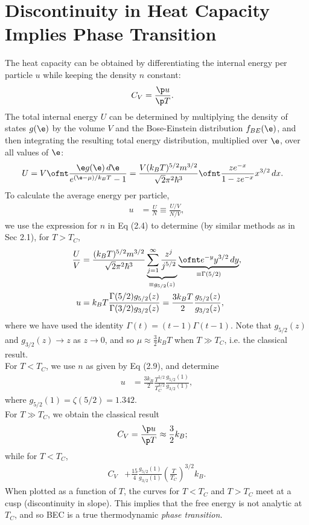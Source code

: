 \documentclass[qo.tex]{subfiles}
\begin{document}
\section{Discontinuity in Heat Capacity Implies Phase Transition}
The heat capacity can be obtained by differentiating the internal energy per particle $u$ while keeping the density $n$ constant:
\begin{align}
    C_V &= \frac{\p u}{\p T}.
\end{align}
The total internal energy $U$ can be determined by multiplying the density of states $g(\e)$ by the volume $V$ and the Bose-Einstein distribution $f_{BE}(\e)$, and then integrating the resulting total energy distribution, multiplied over $\e$, over all values of $\e$:
\begin{align}
    U &= V\ofnt \frac{\e g(\e)\,d\e}{e^{(\e-\mu)/k_BT}-1} = \frac{V(k_BT)^{5/2}m^{3/2}}{\sqrt{2}\pi^2\hbar^3}\ofnt \frac{ze^{-x}}{1-ze^{-x}}x^{3/2}\,dx.
\end{align}
To calculate the average energy per particle, 
\begin{align}
    u &= \frac{U}{N} \equiv \frac{U/V}{N/V},
\end{align}
we use the expression for $n$ in Eq (2.4) to determine (by similar methods as in Sec 2.1), for $T>T_C$,
\begin{align}
    \frac{U}{V} &= \frac{(k_BT)^{5/2}m^{3/2}}{\sqrt{2}\pi^2\hbar^3}\underbrace{\sum_{j=1}^\infty\frac{z^j}{j^{5/2}}}_{\equiv g_{5/2}(z)}\underbrace{\ofnt e^{-y}y^{3/2}\,dy}_{\equiv \Gamma(5/2)},\\
    u &= k_BT\frac{\Gamma(5/2)g_{5/2}(z)}{\Gamma(3/2)g_{3/2}(z)} = \frac{3k_BT}{2}\frac{g_{5/2}(z)}{g_{3/2}(z)},
\end{align}
where we have used the identity $\Gamma(t)=(t-1)\Gamma(t-1)$.
Note that $g_{5/2}(z)$ and $g_{3/2}(z) \to z$ as $z\to0$, and so $\mu\approx \frac32 k_BT$ when $T\gg T_C$, i.e. the classical result. \\
For $T<T_C$, we use $n$ as given by Eq (2.9), and determine
\begin{align}
    u &= \frac{3k_B}{2}\frac{T^{5/2}}{T^{3/2}_C}\frac{g_{5/2}(1)}{g_{3/2}(1)},
\end{align}
where $g_{5/2}(1)=\zeta(5/2)=1.342$.\\
For $T\gg T_C$, we obtain the classical result
\begin{align}
    C_V &= \frac{\p u}{\p T} \approx \frac32 k_B;
\end{align}
while for $T<T_C$,
\begin{align}
    C_V &+ \frac{15}{4}\frac{g_{5/2}(1)}{g_{3/2}(1)}\left(\frac{T}{T_C}\right)^{3/2}k_B.
\end{align}
When plotted as a function of $T$, the curves for $T<T_C$ and $T>T_C$ meet at a cusp (discontinuity in slope).
This implies that the free energy is not analytic at $T_C$, and so BEC is a true thermodynamic \emph{phase transition.}
\end{document}
